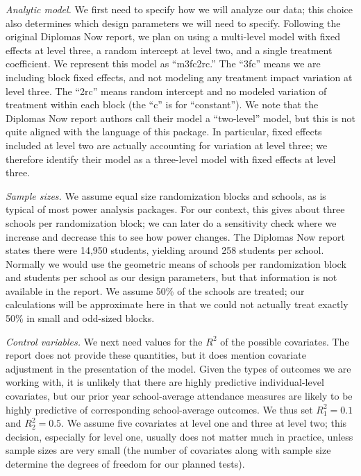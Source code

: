 \documentclass[
]{article}
\begin{document}
\emph{Analytic model.} We first need to specify how we will analyze our
data; this choice also determines which design parameters we will need
to specify. Following the original Diplomas Now report, we plan on using
a multi-level model with fixed effects at level three, a random
intercept at level two, and a single treatment coefficient. We represent
this model as ``m3fc2rc.'' The ``3fc'' means we are including block
fixed effects, and not modeling any treatment impact variation at level
three. The ``2rc'' means random intercept and no modeled variation of
treatment within each block (the ``c'' is for ``constant''). We note
that the Diplomas Now report authors call their model a ``two-level''
model, but this is not quite aligned with the language of this package.
In particular, fixed effects included at level two are actually
accounting for variation at level three; we therefore identify their
model as a three-level model with fixed effects at level three.

\emph{Sample sizes.} We assume equal size randomization blocks and
schools, as is typical of most power analysis packages. For our context,
this gives about three schools per randomization block; we can later do
a sensitivity check where we increase and decrease this to see how power
changes. The Diplomas Now report states there were 14,950 students,
yielding around 258 students per school. Normally we would use the
geometric means of schools per randomization block and students per
school as our design parameters, but that information is not available
in the report. We assume 50\% of the schools are treated; our
calculations will be approximate here in that we could not actually
treat exactly 50\% in small and odd-sized blocks.

\emph{Control variables.} We next need values for the \(R^2\) of the
possible covariates. The report does not provide these quantities, but
it does mention covariate adjustment in the presentation of the model.
Given the types of outcomes we are working with, it is unlikely that
there are highly predictive individual-level covariates, but our prior
year school-average attendance measures are likely to be highly
predictive of corresponding school-average outcomes. We thus set
\(R^2_1 = 0.1\) and \(R^2_2 = 0.5\). We assume five covariates at level
one and three at level two; this decision, especially for level one,
usually does not matter much in practice, unless sample sizes are very
small (the number of covariates along with sample size determine the
degrees of freedom for our planned tests).
\end{document}
